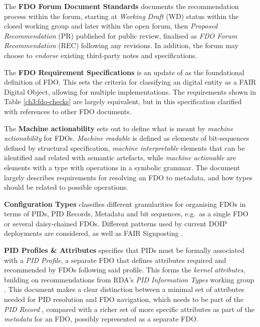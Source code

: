 The \textbf{FDO Forum Document Standards} \cite{fdo-DocProcessStd} documents the recommendation process within the forum, starting at \emph{Working Draft} (WD) status within the closed working group and later within the open forum, then \emph{Proposed Recommendation} (PR) published for public review, finalised as \emph{FDO Forum Recommendation} (REC) following any revisions. In addition, the forum may choose to \emph{endorse} existing third-party notes and specifications.

The \textbf{FDO Requirement Specifications} \cite{fdo-RequirementSpec} is an update of \cite{bonino2019} as the foundational definition of FDO. This sets the criteria for classifying an digital entity as a FAIR Digital Object, allowing for multiple implementations. The requirements shown in Table \vref{ch3:fdo-checks} are largely equivalent, but in this specification clarified with references to other FDO documents.

The \textbf{Machine actionability} \cite{fdo-MachineActionDef} sets out to define what is meant by \emph{machine actionability} for FDOs. \emph{Machine readable} is defined as elements of bit-sequences defined by structural specification, \emph{machine interpretable} elements that can be identified and related with semantic artefacts, while \emph{machine actionable} are elements with a type with operations in a symbolic grammar. The document largely describes requirements for resolving an FDO to metadata, and how types should be related to possible operations.

\textbf{Configuration Types} \cite{fdo-ConfigurationTypes} classifies different granularities for organising FDOs in terms of PIDs, PID Records, Metadata and bit sequences, e.g.~as a single FDO or several daisy-chained FDOs. Different patterns used by current DOIP deployments are considered, as well as FAIR Signposting \cite{vandesompel2015,Van de Sompel 2022}.

\textbf{PID Profiles \& Attributes} \cite{fdo-PIDProfileAttributes} specifies that PIDs must be formally associated with a \emph{PID Profile}, a separate FDO that defines attributes required and recommended by FDOs following said profile. This forms the \emph{kernel attributes}, building on recommendations from RDA's \emph{PID Information Types} working group \cite{weigelRDARecommendationPID2018}. This document makes a clear distinction between a minimal set of attributes needed for PID resolution and FDO navigation, which needs to be part of the \emph{PID Record} \cite{islam_2023}, compared with a richer set of more specific attributes as part of the \emph{metadata} for an FDO, possibly represented as a separate FDO.

